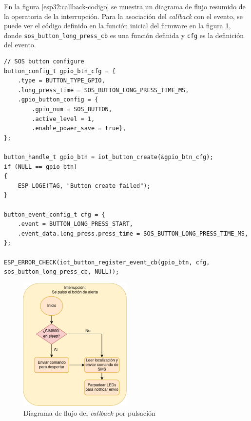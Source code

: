 En la figura \ref{esp32:callback-codigo} se muestra un diagrama de flujo resumido de la operatoria de la interrupción. Para la asociación del \textit{callback} con el evento, se puede ver el código definido en la función inicial del firmware en la figura \ref{fig:esp32:callback-codigo}, donde \texttt{sos\_button\_long\_press\_cb} es una función definida y \texttt{cfg} es la definición del evento.

\begin{lstlisting}[label=esp32:callback-codigo,caption=Definición del evento y asociación del \textit{callback}]  % Start your code-block
// SOS button configure
button_config_t gpio_btn_cfg = {
    .type = BUTTON_TYPE_GPIO,
    .long_press_time = SOS_BUTTON_LONG_PRESS_TIME_MS,
    .gpio_button_config = {
        .gpio_num = SOS_BUTTON,
        .active_level = 1,
        .enable_power_save = true},
};

button_handle_t gpio_btn = iot_button_create(&gpio_btn_cfg);
if (NULL == gpio_btn)
{
    ESP_LOGE(TAG, "Button create failed");
}

button_event_config_t cfg = {
    .event = BUTTON_LONG_PRESS_START,
    .event_data.long_press.press_time = SOS_BUTTON_LONG_PRESS_TIME_MS,
};

ESP_ERROR_CHECK(iot_button_register_event_cb(gpio_btn, cfg, sos_button_long_press_cb, NULL));

\end{lstlisting}

\begin{figure}[H]
	\centering
	\includegraphics[width=0.5\textwidth]{./Figures/esp32-callback.png}
	\caption{Diagrama de flujo del \textit{callback} por pulsación}
	\label{fig:esp32:callback-codigo}
\end{figure}


